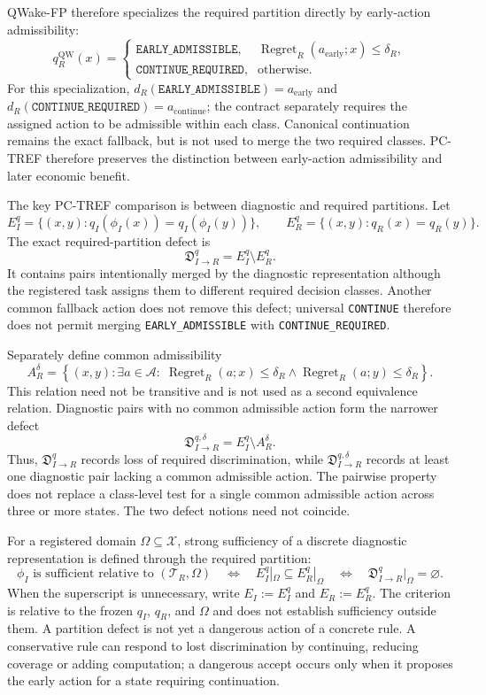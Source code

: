 QWake-FP therefore specializes the required partition directly by early-action
admissibility:
\[
 q_R^{\mathrm{QW}}(x)=
 \begin{cases}
   \texttt{EARLY\_ADMISSIBLE},&
   \operatorname{Regret}_R(a_{\mathrm{early}};x)\leq\delta_R,\\
   \texttt{CONTINUE\_REQUIRED},&\text{otherwise}.
 \end{cases}
\]
For this specialization,
$d_R(\texttt{EARLY\_ADMISSIBLE})=a_{\mathrm{early}}$ and
$d_R(\texttt{CONTINUE\_REQUIRED})=a_{\mathrm{continue}}$; the contract separately
requires the assigned action to be admissible within each class. Canonical continuation
remains the exact fallback, but is not used to merge the two required classes. PC-TREF
therefore preserves the distinction between early-action admissibility and later
economic benefit.

The key PC-TREF comparison is between diagnostic and required partitions. Let
\[
  E_I^q=\{(x,y):q_I(\phi_I(x))=q_I(\phi_I(y))\},
  \qquad
  E_R^q=\{(x,y):q_R(x)=q_R(y)\}.
\]
The exact required-partition defect is
\[
  \mathfrak D_{I\to R}^{q}=E_I^q\setminus E_R^q.
\]
It contains pairs intentionally merged by the diagnostic representation although the
registered task assigns them to different required decision classes. Another common
fallback action does not remove this defect; universal \texttt{CONTINUE} therefore
does not permit merging \texttt{EARLY\_ADMISSIBLE} with
\texttt{CONTINUE\_REQUIRED}.

Separately define common admissibility
\[
  A_R^{\delta}
  =\left\{(x,y):\exists a\in\mathcal A:\;
  \operatorname{Regret}_R(a;x)\leq\delta_R
  \land
  \operatorname{Regret}_R(a;y)\leq\delta_R\right\}.
\]
This relation need not be transitive and is not used as a second equivalence relation.
Diagnostic pairs with no common admissible action form the narrower defect
\[
  \mathfrak D_{I\to R}^{q,\delta}=E_I^q\setminus A_R^{\delta}.
\]
Thus, $\mathfrak D_{I\to R}^{q}$ records loss of required discrimination, while
$\mathfrak D_{I\to R}^{q,\delta}$ records at least one diagnostic pair lacking a
common admissible action. The pairwise property does not replace a class-level test for
a single common admissible action across three or more states. The two defect notions
need not coincide.

For a registered domain $\Omega\subseteq\mathcal X$, strong sufficiency of a discrete
diagnostic representation is defined through the required partition:
\[
  \phi_I\text{ is sufficient relative to }(\mathcal T_R,\Omega)
  \quad\Longleftrightarrow\quad
  E_I^q|_{\Omega}\subseteq E_R^q|_{\Omega}
  \quad\Longleftrightarrow\quad
  \mathfrak D_{I\to R}^{q}|_{\Omega}=\varnothing.
\]
When the superscript is unnecessary, write $E_I:=E_I^q$ and $E_R:=E_R^q$. The
criterion is relative to the frozen $q_I$, $q_R$, and $\Omega$ and does not establish
sufficiency outside them. A partition defect is not yet a dangerous action of a
concrete rule. A conservative rule can respond to lost discrimination by continuing,
reducing coverage or adding computation; a dangerous accept occurs only when it
proposes the early action for a state requiring continuation.

